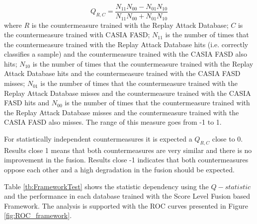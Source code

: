 \begin{equation}
\label{eq:Qstatistic}
Q_{R,C} = \frac{N_{11}N_{00} - N_{01}N_{10}}{N_{11}N_{00} +N_{01}N_{10}}
\end{equation}
where $R$ is the countermeasure trained with the Replay Attack Database; $C$ is the countermeasure trained with CASIA FASD; $N_{11}$ is the number of times that the countermeasure trained with the Replay Attack Database hits (i.e. correctly classifies a sample) and the countermeasure trained with the CASIA FASD also hits; $N_{10}$ is the number of times that the countermeasure trained with the Replay Attack Database hits and the countermeasure trained with the CASIA FASD misses; $N_{01}$ is the number of times that the countermeasure trained with the Replay Attack Database misses and the countermeasure trained with the CASIA FASD hits and $N_{00}$ is the number of times that the countermeasure trained with the Replay Attack Database misses and the countermeasure trained with the CASIA FASD also misses. The range of this measure goes from -1 to 1.

For statistically independent countermeasures it is expected a $Q_{R,C}$ close to 0. Results close 1 means that both countermeasures are very similar and there is no improvement in the fusion. Results close -1 indicates that both countermeasures oppose each other and a high degradation in the fusion should be expected. 

Table \ref{tb:FrameworkTest} shows the statistic dependency using the $Q-statistic$ and the performance in each database trained with the Score Level Fusion based Framework. The analysis is supported with the ROC curves presented in Figure \ref{fig:ROC_framework}.

